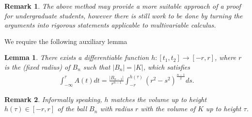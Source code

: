 \documentclass[12pt, a4paper, titlepage]{article}
\newtheorem{lemma}{Lemma}
\newtheorem{remark}{Remark}
\begin{document}
\begin{remark} The above method may provide a more suitable approach of a proof for undergraduate students, however there is still work to be done by turning the arguments into rigorous statements applicable to multivariable calculus. 
\end{remark}
\newpage
We require the following auxiliary lemma
\begin{lemma} There exists a differentiable function $h: [t_1,t_2] \to [-r,r]$, where $r$ is the (fixed radius) of $B_n$ such that $|B_n|=|K|$, which satisfies
\begin{align*}
\int_{- \infty}^\tau A(t)dt = \frac{|B_{n-1}|}{r^{n-1}} \int_{-r}^{h( \tau)} (r^2-s^2)^{\frac{n-1}{2}} ds. 
\end{align*}
\end{lemma}
\begin{remark} Informally speaking, $h$ matches the volume up to height $h( \tau) \in [-r,r]$  of the ball $B_n$ with radius $r$ with the volume of $K$ up to height $\tau$. 
\end{remark}
\end{document}
